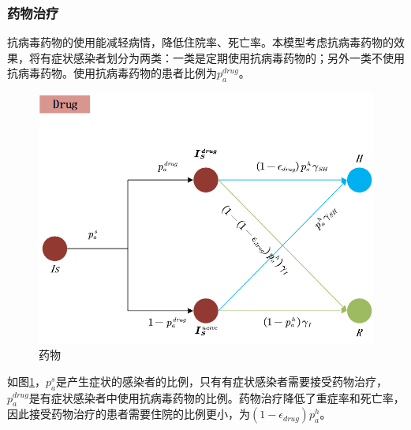 \documentclass[bwprint]{gmcmthesis}
\numberwithin{figure}{section}
\begin{document}
\subsubsection{药物治疗}
抗病毒药物的使用能减轻病情，降低住院率、死亡率。本模型考虑抗病毒药物的效果，将有症状感染者划分为两类：一类是定期使用抗病毒药物的；另外一类不使用抗病毒药物。使用抗病毒药物的患者比例为$p_a^{drug}$。
\begin{figure}[!h]
\centering
\includegraphics[width=.75\textwidth]{Drug.png}
\caption{药物}
\label{drug}
\end{figure}
如图\ref{drug}，$p_a^s$是产生症状的感染者的比例，只有有症状感染者需要接受药物治疗，$p_a^{drug}$是有症状感染者中使用抗病毒药物的比例。药物治疗降低了重症率和死亡率，因此接受药物治疗的患者需要住院的比例更小，为$(1-\epsilon_{drug})p_a^h$。
\end{document}
